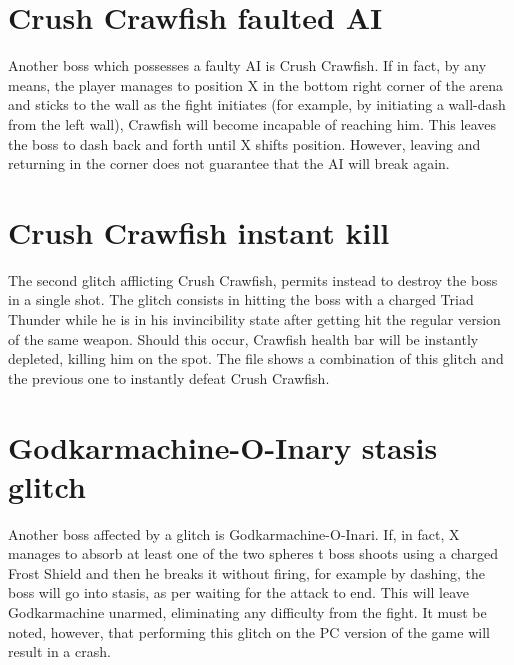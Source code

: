 \section{Crush Crawfish faulted AI}\label{glitch:Crawfish_AI}
Another boss which possesses a faulty AI is Crush Crawfish.
If in fact, by any means, the player manages to position X in the bottom right corner of the arena and sticks to the wall as the fight initiates (for example, by initiating a wall-dash from the left wall), Crawfish will become incapable of reaching him. This leaves the boss to dash back and forth until X shifts position. However, leaving and returning in the corner does not guarantee that the AI will break again.

\section{Crush Crawfish instant kill}\label{glitch:Crawfish}
The second glitch afflicting Crush Crawfish, permits instead to destroy the boss in a single shot. The glitch consists in hitting the boss with a charged Triad Thunder while he is in his invincibility state after getting hit the regular version of the same weapon. Should this occur, Crawfish health bar will be instantly depleted, killing him on the spot. The file  shows a combination of this glitch and the previous one to instantly defeat Crush Crawfish.

\section{Godkarmachine-O-Inary stasis glitch}\label{glitch:Karmachine}
Another boss affected by a glitch is Godkarmachine-O-Inari. If, in fact, X manages to absorb at least one of the two spheres t boss shoots using a charged Frost Shield and then he breaks it without firing, for example by dashing, the boss will go into stasis, as per waiting for the attack to end. This will leave Godkarmachine unarmed, eliminating any difficulty from the fight. It must be noted, however, that performing this glitch on the PC version of the game will result in a crash.
